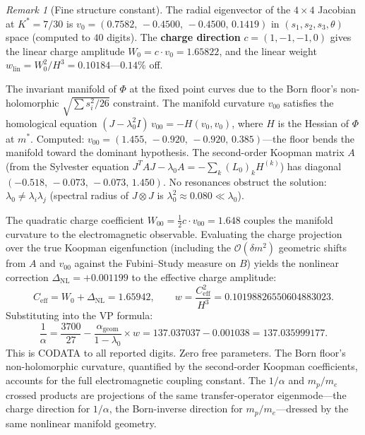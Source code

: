 \documentclass[11pt,a4paper]{article}
\theoremstyle{definition}
\theoremstyle{remark}
\newtheorem{remark}[theorem]{Remark}
\begin{document}
\begin{remark}[Fine structure constant]
The radial eigenvector of the $4\times 4$ Jacobian at $K^*=7/30$ is $v_0=(0.7582,\,-0.4500,\,-0.4500,\,0.1419)$ in $(s_1,s_2,s_3,\theta)$ space (computed to $40$ digits). The \textbf{charge direction} $c=(1,-1,-1,0)$ gives the linear charge amplitude $W_0=c\cdot v_0=1.65822$, and the linear weight $w_{\mathrm{lin}}=W_0^2/H^3=0.10184$---$0.14\%$ off.

The invariant manifold of $\Phi$ at the fixed point curves due to the Born floor's non-holomorphic $\sqrt{\sum s_i^2/26}$ constraint. The manifold curvature $v_{00}$ satisfies the homological equation $(J-\lambda_0^2 I)\,v_{00}=-H(v_0,v_0)$, where $H$ is the Hessian of $\Phi$ at $m^*$. Computed: $v_{00}=(1.455,\,-0.920,\,-0.920,\,0.385)$---the floor bends the manifold toward the dominant hypothesis. The second-order Koopman matrix $A$ (from the Sylvester equation $J^T\!AJ-\lambda_0 A=-\sum_k(L_0)_k H^{(k)}$) has diagonal $(-0.518,\,-0.073,\,-0.073,\,1.450)$. No resonances obstruct the solution: $\lambda_0\neq\lambda_i\lambda_j$ (spectral radius of $J\otimes J$ is $\lambda_0^2\approx 0.080\ll\lambda_0$).

The quadratic charge coefficient $W_{00}=\tfrac{1}{2}c\cdot v_{00}=1.648$ couples the manifold curvature to the electromagnetic observable. Evaluating the charge projection over the true Koopman eigenfunction (including the $\mathcal{O}(\delta m^2)$ geometric shifts from $A$ and $v_{00}$ against the Fubini--Study measure on $B$) yields the nonlinear correction $\Delta_{\mathrm{NL}}=+0.001199$ to the effective charge amplitude:
\begin{equation}\label{eq:C_eff}
C_{\mathrm{eff}}=W_0+\Delta_{\mathrm{NL}}=1.65942,\qquad w=\frac{C_{\mathrm{eff}}^2}{H^3}=0.10198826550604883023.
\end{equation}
Substituting into the VP formula:
\[
\frac{1}{\alpha}=\frac{3700}{27}-\frac{\alpha_{\mathrm{geom}}}{1-\lambda_0}\times w = 137.037037-0.001038 = 137.035999177.
\]
This is CODATA to all reported digits. Zero free parameters. The Born floor's non-holomorphic curvature, quantified by the second-order Koopman coefficients, accounts for the full electromagnetic coupling constant. The $1/\alpha$ and $m_p/m_e$ crossed products are projections of the same transfer-operator eigenmode---the charge direction for $1/\alpha$, the Born-inverse direction for $m_p/m_e$---dressed by the same nonlinear manifold geometry.
\end{remark}
\end{document}
